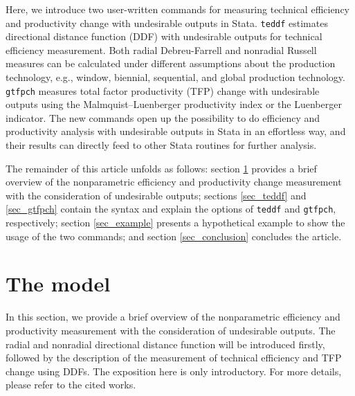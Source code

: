 Here, we introduce two user-written commands for measuring technical efficiency and productivity change with undesirable outputs in Stata. {\tt teddf} estimates directional distance function (DDF) with undesirable outputs for technical efficiency measurement. Both radial Debreu-Farrell and nonradial Russell measures can be calculated under different assumptions about the production technology, e.g., window, biennial, sequential, and global production technology.
{\tt gtfpch} measures total factor productivity (TFP) change with undesirable outputs using the Malmquist–Luenberger productivity index or the Luenberger indicator. 
The new commands open up the possibility to do efficiency and productivity analysis with undesirable outputs in Stata in an effortless way, and their results can directly feed to other Stata routines for further analysis. 

The remainder of this article unfolds as follows: 
section \ref{sec_method} provides a brief overview of the nonparametric efficiency and productivity change measurement with the consideration of undesirable outputs; 
sections \ref{sec_teddf} and \ref{sec_gtfpch} contain the syntax and explain the options of {\tt teddf} and {\tt gtfpch}, respectively; 
section \ref{sec_example} presents a hypothetical example to show the usage of the two commands; 
and section \ref{sec_conclusion} concludes the article.

\section{The model}\label{sec_method}
In this section, we provide a brief overview of the nonparametric efficiency and productivity measurement with the consideration of undesirable outputs. 
The radial and nonradial directional distance function will be introduced firstly, followed by the description of the measurement of technical efficiency and TFP change using DDFs. 
The exposition here is only introductory. For more details, please refer to the cited works.

